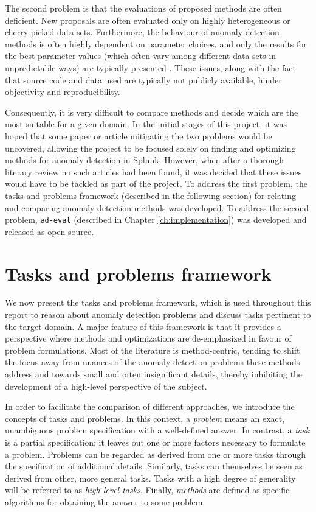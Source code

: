 The second problem is that the evaluations of proposed methods are often deficient. New proposals are often evaluated only on highly heterogeneous or cherry-picked data sets. Furthermore, the behaviour of anomaly detection methods is often highly dependent on parameter choices, and only the results for the best parameter values (which often vary among different data sets in unpredictable ways) are typically presented \cite{keogh5}. These issues, along with the fact that source code and data used are typically not publicly available, hinder objectivity and reproducibility. 

Consequently, it is very difficult to compare methods and decide which are the most suitable for a given domain. In the initial stages of this project, it was hoped that some paper or article mitigating the two problems would be uncovered, allowing the project to be focused solely on finding and optimizing methods for anomaly detection in Splunk. However, when after a thorough literary review no such articles had been found, it was decided that these issues would have to be tackled as part of the project. To address the first problem, the tasks and problems framework (described in the following section) for relating and comparing anomaly detection methods was developed. To address the second problem, \texttt{ad-eval} (described in Chapter \ref{ch:implementation}) was developed and released as open source.

\section{Tasks and problems framework}
\label{sect:tasks_problems}

We now present the tasks and problems framework, which is used throughout this report to reason about anomaly detection problems and discuss tasks pertinent to the target domain. A major feature of this framework is that it provides a perspective where methods and optimizations are de-emphasized in favour of problem formulations. Most of the literature is method-centric, tending to shift the focus away from nuances of the anomaly detection problems these methods address and towards small and often insignificant details, thereby inhibiting the development of a high-level perspective of the subject.

In order to facilitate the comparison of different approaches, we introduce the concepts of tasks and problems. In this context, a \emph{problem} means an exact, unambiguous problem specification with a well-defined answer. In contrast, a \emph{task} is a partial specification; it leaves out one or more factors necessary to formulate a problem. Problems can be regarded as derived from one or more tasks through the specification of additional details. Similarly, tasks can themselves be seen as derived from other, more general tasks. Tasks with a high degree of generality will be referred to as \emph{high level tasks}. Finally, \emph{methods} are defined as specific algorithms for obtaining the answer to some problem.


